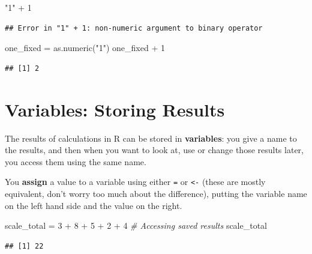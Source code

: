 \documentclass[
]{book}
\newenvironment{Shaded}{\begin{snugshade}}{\end{snugshade}}
\newcommand{\CommentTok}[1]{\textcolor[rgb]{0.56,0.35,0.01}{\textit{#1}}}
\newcommand{\DecValTok}[1]{\textcolor[rgb]{0.00,0.00,0.81}{#1}}
\newcommand{\FunctionTok}[1]{\textcolor[rgb]{0.00,0.00,0.00}{#1}}
\newcommand{\NormalTok}[1]{#1}
\newcommand{\OtherTok}[1]{\textcolor[rgb]{0.56,0.35,0.01}{#1}}
\newcommand{\SpecialCharTok}[1]{\textcolor[rgb]{0.00,0.00,0.00}{#1}}
\newcommand{\StringTok}[1]{\textcolor[rgb]{0.31,0.60,0.02}{#1}}
\begin{document}
\begin{Shaded}
\begin{Highlighting}[]
\StringTok{"1"} \SpecialCharTok{+} \DecValTok{1}
\end{Highlighting}
\end{Shaded}

\begin{verbatim}
## Error in "1" + 1: non-numeric argument to binary operator
\end{verbatim}

\begin{Shaded}
\begin{Highlighting}[]
\NormalTok{one\_fixed }\OtherTok{=} \FunctionTok{as.numeric}\NormalTok{(}\StringTok{"1"}\NormalTok{)}
\NormalTok{one\_fixed }\SpecialCharTok{+} \DecValTok{1}
\end{Highlighting}
\end{Shaded}

\begin{verbatim}
## [1] 2
\end{verbatim}

\hypertarget{variables-storing-results}{%
\section{Variables: Storing Results}\label{variables-storing-results}}

The results of calculations in R can be stored in \textbf{variables}: you
give a name to the results, and then when you want to look at, use
or change those results later, you access them using the same name.

You \textbf{assign} a value to a variable using either \texttt{=} or \texttt{\textless{}-} (these
are mostly equivalent, don't worry too much about the difference), putting
the variable name on the left hand side and the value on the right.

\begin{Shaded}
\begin{Highlighting}[]
\NormalTok{scale\_total }\OtherTok{=} \DecValTok{3} \SpecialCharTok{+} \DecValTok{8} \SpecialCharTok{+} \DecValTok{5} \SpecialCharTok{+} \DecValTok{2} \SpecialCharTok{+} \DecValTok{4}
\CommentTok{\# Accessing saved results}
\NormalTok{scale\_total}
\end{Highlighting}
\end{Shaded}

\begin{verbatim}
## [1] 22
\end{verbatim}
\end{document}
